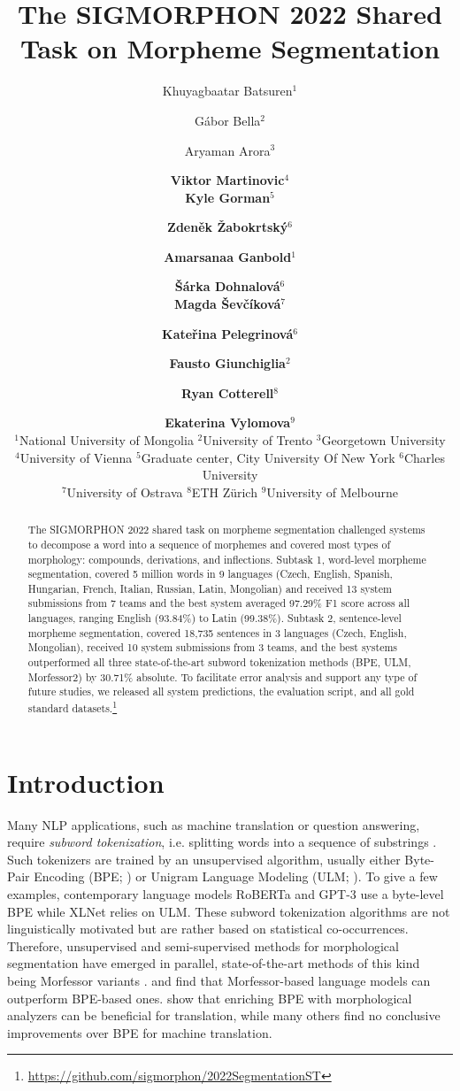 \documentclass[11pt]{article}
\title{The SIGMORPHON 2022 Shared Task on Morpheme Segmentation}
\author{Khuyagbaatar Batsuren$^1$ \and G{\'a}bor Bella$^2$ \and Aryaman Arora$^3$ \and {\bf Viktor Martinovic}$^4$ \\ {\bf Kyle Gorman$^{5}$} \and {\bf Zdeněk Žabokrtský}$^6$ \and {\bf Amarsanaa Ganbold$^{1}$} \and {\bf Šárka Dohnalová}$^6$ \\ {\bf Magda Ševčíková}$^7$ \and {\bf Kateřina Pelegrinová}$^6$ \and {\bf Fausto Giunchiglia}$^2$ \and {\bf Ryan Cotterell}$^8$ \\ \and {\bf Ekaterina Vylomova}$^{9}$ \\ $^1$National University of Mongolia \hspace{.1cm} $^2$University of Trento \hspace{.1cm} $^3$Georgetown University \\ $^4$University of Vienna \hspace{.1cm} $^5$Graduate center, City University Of New York \hspace{.1cm} $^6$Charles University \\ $^7$University of Ostrava \hspace{.1cm} $^8$ETH Zürich \hspace{.1cm} $^9$University of Melbourne \\ 
}
\begin{document}
\maketitle
\begin{abstract}
The SIGMORPHON 2022 shared task on morpheme segmentation challenged systems to decompose a word into a sequence of morphemes and covered most types of morphology: compounds, derivations, and inflections. Subtask 1, word-level morpheme segmentation, covered 5 million words in 9 languages (Czech, English, Spanish, Hungarian, French, Italian, Russian, Latin, Mongolian) and received 13 system submissions from 7 teams and the best system averaged 97.29\% F1 score across all languages, ranging English (93.84\%) to Latin (99.38\%). Subtask 2, sentence-level morpheme segmentation, covered 18,735 sentences in 3 languages (Czech, English, Mongolian), received 10 system submissions from 3 teams, and the best systems outperformed all three state-of-the-art subword tokenization methods (BPE, ULM, Morfessor2) by 30.71\% absolute.
To facilitate error analysis and support any type of future studies, we released all system predictions, the evaluation script, and all gold standard datasets.\footnote{\url{https://github.com/sigmorphon/2022SegmentationST}}

\end{abstract}

\section{Introduction}
Many NLP applications, such as machine translation or question answering, require \emph{subword tokenization}, i.e. splitting words into a sequence of substrings \cite{mielke2021between}. Such tokenizers are trained by an unsupervised algorithm, usually either Byte-Pair Encoding (BPE; \citealt{gage1994new,sennrich2016neural}) or Unigram Language Modeling (ULM; \citealt{kudo-2018-subword}). To give a few examples, contemporary language models RoBERTa \cite{liu2019roberta} and GPT-3 \cite{brown2020language} use a byte-level BPE \cite{radford2019language} while XLNet \cite{yang2019xlnet} relies on ULM. These subword tokenization algorithms are not linguistically motivated but are rather based on statistical co-occurrences. Therefore, unsupervised and semi-supervised methods for morphological segmentation \cite{creutz2005unsupervised} have emerged in parallel, state-of-the-art methods of this kind being Morfessor variants \cite{gronroos2014morfessor,gronroos2020morfessor}. \citet{ataman2017linguistically} and \citet{schwartz2020neural} find that Morfessor-based language models can outperform BPE-based ones. \citet{matthews2018using,nzeyimana2022kinyabert} show that enriching BPE with morphological analyzers can be beneficial for translation, while many others \cite{domingo2018much,machavcek2018morphological,schwartz2020neural,saleva-lignos-2021-effectiveness} find no conclusive improvements over BPE for machine translation. 
\end{document}
